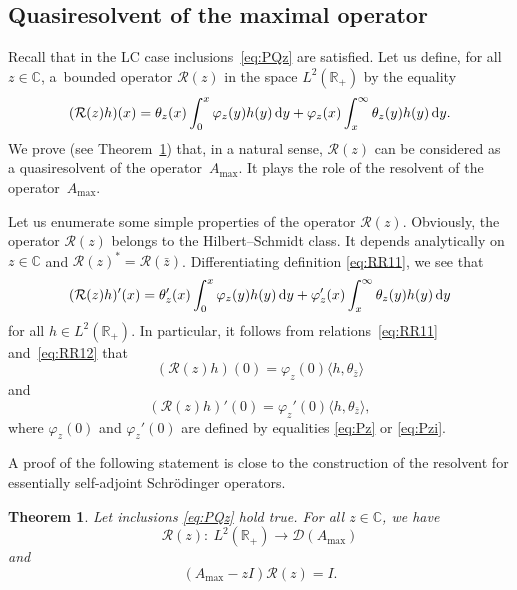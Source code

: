 \documentclass[pdftex]{sigma}%
\numberwithin{equation}{section}
\newtheorem{Theorem}{Theorem}[section]
\begin{document}
\subsection{Quasiresolvent of the maximal operator}\label{section3.1}

Recall that in the LC case
 inclusions~\eqref{eq:PQz} are satisfied. Let us define, for all $z\in {\mathbb C}$, a~bounded operator ${\mathcal R} (z)$ in the space $L^2 ({\mathbb R}_{+})$ by the equality
 \begin{equation}
 ( {\mathcal R} (z)h) (x) = \theta_{z} (x) \int_{0}^x \varphi_{z} (y) h(y) \,{\rm d}y+
\varphi_{z} (x) \int_x^\infty \theta_{z} (y) h(y) \,{\rm d} y .
 \label{eq:RR11}\end{equation}
We prove (see Theorem~\ref{res}) that, in a natural sense, ${\mathcal R} (z)$ can be considered as a quasiresolvent of the operator~$A_{\max}$. It plays the role of the resolvent of the operator~$A_{\max}$.

Let us enumerate some simple properties of the operator ${\mathcal R} (z)$.
 Obviously, the operator ${\mathcal R} (z)$ belongs to the Hilbert--Schmidt class. It depends analytically on $z\in {\mathbb C}$ and ${\mathcal R} (z)^*={\mathcal R} (\bar{z})$. Differentiating
 definition \eqref{eq:RR11}, we see that
 \begin{equation}
 ( {\mathcal R} (z)h)' (x) = \theta_{z}' (x) \int_{0}^x \varphi_{z} (y) h(y) \,{\rm d}y+
 \varphi_{z}' (x) \int_x^\infty \theta_{z} (y) h(y) \,{\rm d}y
 \label{eq:RR12}\end{equation}
 for all $h\in L^2 ({\mathbb R}_{+})$.
 In particular, it follows from relations~\eqref{eq:RR11} and~\eqref{eq:RR12} that
 \begin{equation}
({\mathcal R} (z)h)(0)= \varphi_{z} (0)\langle h, \theta_{\bar{z}}\rangle
\label{eq:r01}\end{equation}
and
 \begin{equation}
({\mathcal R} (z)h)'(0)= \varphi_{z}' (0)\langle h, \theta_{\bar{z}}\rangle,
\label{eq:r02}\end{equation}
where $\varphi_{z} (0)$ and $\varphi_{z}' (0)$ are defined by equalities \eqref{eq:Pz} or \eqref{eq:Pzi}.


A proof of the following statement is close to the construction of the resolvent for essentially self-adjoint Schr\"odinger operators.

 \begin{Theorem}\label{res}
 Let inclusions \eqref{eq:PQz} hold true.
 For all $z \in {\mathbb C}$, we have
 \begin{equation}
{\mathcal R} (z)\colon \ L^2 ({\mathbb R}_{+})\to {\mathcal D} (A_{\max} )
\label{eq:qres}\end{equation}
and
 \begin{equation}
(A_{\max} -zI) {\mathcal R} (z)=I.
\label{eq:qres1}\end{equation}
 \end{Theorem}
\end{document}
